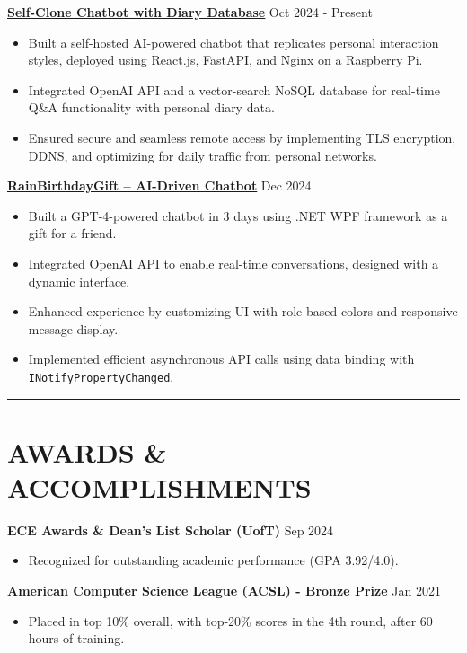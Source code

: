 \documentclass[a4paper,10pt]{article}
\begin{document}
\vspace{0.3cm}
\noindent\href{https://chengyongkang.me/chat}{\uline{
\textbf{Self-Clone Chatbot with Diary Database}}} \hfill Oct 2024 - Present
\begin{itemize}[leftmargin=0.2in]
    \item Built a self-hosted AI-powered chatbot that replicates personal interaction styles, deployed using React.js, FastAPI, and Nginx on a Raspberry Pi.
    \item Integrated OpenAI API and a vector-search NoSQL database for real-time Q\&A functionality with personal diary data.
    \item Ensured secure and seamless remote access by implementing TLS encryption, DDNS, and optimizing for daily traffic from personal networks.
\end{itemize}

\vspace{0.3cm}
\noindent\href{https://github.com/Ken-2511/RainBirthdayGift}{\uline{
\textbf{RainBirthdayGift – AI-Driven Chatbot}}} \hfill Dec 2024
\begin{itemize}[leftmargin=0.2in]
    \item Built a GPT-4-powered chatbot in 3 days using .NET WPF framework as a gift for a friend.
    \item Integrated OpenAI API to enable real-time conversations, designed with a dynamic interface.
    \item Enhanced experience by customizing UI with role-based colors and responsive message display.
    \item Implemented efficient asynchronous API calls using data binding with \texttt{INotifyPropertyChanged}.
\end{itemize}


\noindent\rule{\linewidth}{1pt}

\section*{\textbf{AWARDS \& ACCOMPLISHMENTS}}

\noindent\textbf{ECE Awards \& Dean's List Scholar (UofT)} \hfill Sep 2024
\begin{itemize}[leftmargin=0.2in]
    \item Recognized for outstanding academic performance (GPA 3.92/4.0).
\end{itemize}

\vspace{0.3cm}
\noindent\textbf{American Computer Science League (ACSL) - Bronze Prize} \hfill Jan 2021
\begin{itemize}[leftmargin=0.2in]
    \item Placed in top 10\% overall, with top-20\% scores in the 4th round, after 60 hours of training.
\end{itemize}
\end{document}
